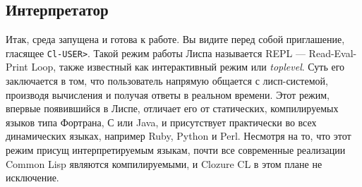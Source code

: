 \documentclass[a4paper, 12pt, titlepage, twoside]{article}
\begin{document}
\subsection{Интерпретатор}
Итак, среда запущена и готова к работе. Вы видите перед собой приглашение, гласящее \verb|Cl-USER>|. Такой режим работы Лиспа называется REPL --- Read-Eval-Print Loop, также известный как интерактивный режим или \textit{toplevel}. Суть его заключается в том, что пользователь напрямую общается с лисп-системой, производя вычисления и получая ответы в реальном времени. Этот режим, впервые появившийся в Лиспе, отличает его от статических, компилируемых языков типа Фортрана, С или Java, и присутствует практически во всех динамических языках, например Ruby, Python и Perl. Несмотря на то, что этот режим присущ интерпретируемым языкам, почти все современные реализации Common Lisp являются компилируемыми, и Clozure CL в этом плане не исключение.
\end{document}
